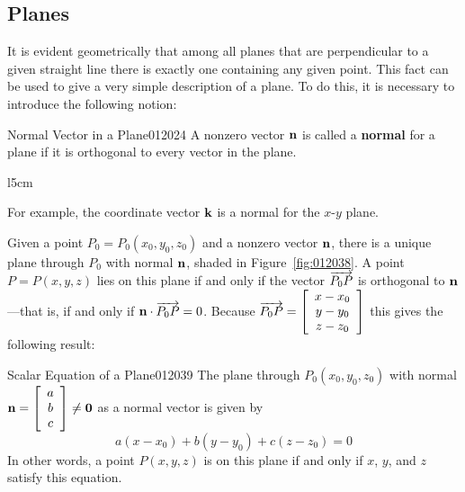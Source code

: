 \subsection*{Planes}


It
 is evident geometrically that among all planes that are perpendicular 
to a given straight line there is exactly one containing any given 
point. This fact can be used to give a very simple description of a 
plane. To do this, it is necessary to introduce the following notion:

\begin{definition}{Normal Vector in a Plane}{012024}
A nonzero vector $\textbf{n}$ is called a \textbf{normal} for a plane if it is orthogonal to every vector in the plane.
\end{definition}

\begin{wrapfigure}[6]{l}{5cm} 
\centering

\caption{\label{fig:012038}}
\end{wrapfigure}

\noindent For example, the coordinate vector $\textbf{k}$ is a normal for the $x$-$y$ plane.

Given a point $P_{0} = P_{0}(x_{0}, y_{0}, z_{0})$ and a nonzero vector $\textbf{n}$, there is a unique plane through $P_{0}$ with normal $\textbf{n}$, shaded in Figure~\ref{fig:012038}. A point $P = P(x, y, z)$ lies on this plane if and only if the vector $\overrightarrow{P_{0}P}$ is orthogonal to $\textbf{n}$---that is, if and only if $\textbf{n} \cdot \overrightarrow{P_{0}P} = 0$. Because $\overrightarrow{P_{0}P} = \left[
\begin{array}{c}
x - x_{0}\\
y - y_{0}\\
z - z_{0}
\end{array}
\right]$ this gives the following result:
\vspace{1em}

\begin{theorem*}{Scalar Equation of a Plane}{012039}
The plane through $P_{0}(x_{0}, y_{0}, z_{0})$ with normal $\textbf{n} = \left[
\begin{array}{c}
a\\
b\\
c
\end{array}
\right]
\neq \textbf{0}$ 
 as a normal vector is given by
\begin{equation*}
a(x - x_{0}) + b(y - y_{0}) + c(z - z_{0}) = 0
\end{equation*}
In other words, a point $P(x, y, z)$ is on this plane if and only if $x$, $y$, and $z$ satisfy this equation.
\end{theorem*}

